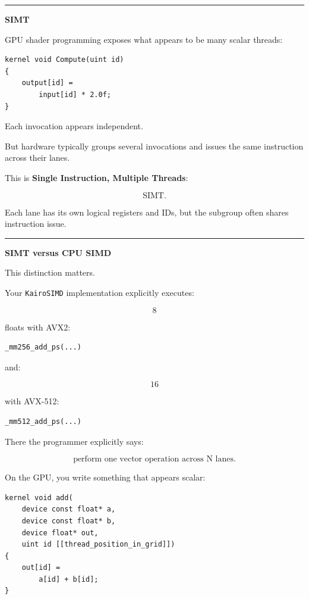 \begin{center}\rule{0.5\linewidth}{0.5pt}\end{center}

\textbf{SIMT}

GPU shader programming exposes what appears to be many scalar threads:

\protect{}\label{e937zu}%
\begin{verbatim}
kernel void Compute(uint id)
{
    output[id] =
        input[id] * 2.0f;
}
\end{verbatim}

Each invocation appears independent.

But hardware typically groups several invocations and issues the same instruction across their lanes.

This is \textbf{Single Instruction, Multiple Threads}:

\[
\boxed{\text{SIMT}.}
\]

Each lane has its own logical registers and IDs, but the subgroup often shares instruction issue.

\begin{center}\rule{0.5\linewidth}{0.5pt}\end{center}

\textbf{SIMT versus CPU SIMD}

This distinction matters.

Your \texttt{KairoSIMD} implementation explicitly executes:

\[
8
\]

floats with AVX2:

\protect{}\label{qpohrx}%
\begin{verbatim}
_mm256_add_ps(...)
\end{verbatim}

and:

\[
16
\]

with AVX-512:

\protect{}\label{6vk2sf}%
\begin{verbatim}
_mm512_add_ps(...)
\end{verbatim}

There the programmer explicitly says:

\[
\boxed{\text{perform one vector operation across N lanes}.}
\]

On the GPU, you write something that appears scalar:

\protect{}\label{2o38s4}%
\begin{verbatim}
kernel void add(
    device const float* a,
    device const float* b,
    device float* out,
    uint id [[thread_position_in_grid]])
{
    out[id] =
        a[id] + b[id];
}
\end{verbatim}


